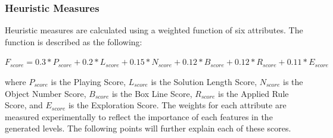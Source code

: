 \subsubsection{Heuristic Measures}
Heuristic measures are calculated using a weighted function of six attributes. The function is described as the following:
\begin{center}$F_{score} = 0.3 * P_{score} + 0.2 * L_{score} + 0.15 * N_{score} + 0.12 * B_{score} + 0.12 * R_{score} + 0.11 * E_{score}$\end{center}
where $P_{score}$ is the Playing Score, $L_{score}$ is the Solution Length Score, $N_{score}$ is the Object Number Score, $B_{score}$ is the Box Line Score, $R_{score}$ is the Applied Rule Score, and $E_{score}$ is the Exploration Score. The weights for each attribute are measured experimentally to reflect the importance of each features in the generated levels. The following points will further explain each of these scores.
